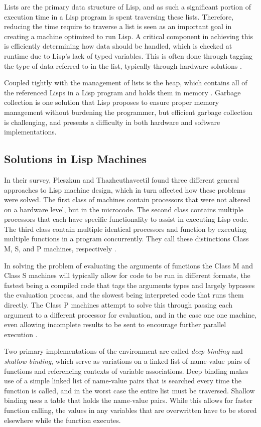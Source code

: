 \documentclass[journal]{IEEEtran}
\begin{document}
Lists are the primary data structure of Lisp, and as such a significant portion of execution time in a Lisp program is spent traversing these lists. Therefore, reducing the time require to traverse a list is seen as an important goal in creating a machine optimized to run Lisp. A critical component in achieving this is efficiently determining how data should be handled, which is checked at runtime due to Lisp's lack of typed variables. This is often done through tagging the type of data referred to in the list, typically through hardware solutions \cite{pt}.

Coupled tightly with the management of lists is the heap, which contains all of the referenced Lisps in a Lisp program and holds them in memory \cite{pt}. Garbage collection is one solution that Lisp proposes to ensure proper memory management without burdening the programmer, but efficient garbage collection is challenging, and presents a difficulty in both hardware and software implementations.

\subsection{Solutions in Lisp Machines}
In their survey, Pleszkun and Thazheuthaveetil found three different general approaches to Lisp machine design, which in turn affected how these problems were solved. The first class of machines contain processors that were not altered on a hardware level, but in the microcode. The second class contains multiple processors that each have specific functionality to assist in executing Lisp code. The third class contain multiple identical processors and function by executing multiple functions in a program concurrently. They call these distinctions Class M, S, and P machines, respectively \cite{pt}.

In solving the problem of evaluating the arguments of functions the Class M and Class S machines will typically allow for code to be run in different formats, the fastest being a compiled code that tags the arguments types and largely bypasses the evaluation process, and the slowest being interpreted code that runs them directly. The Class P machines attempt to solve this through passing each argument to a different processor for evaluation, and in the case one one machine, even allowing incomplete results to be sent to encourage further parallel execution \cite{pt}.

Two primary implementations of the environment are called \textit{deep binding} and \textit{shallow binding}, which serve as variations on a linked list of name-value pairs of functions and referencing contexts of variable associations. Deep binding makes use of a simple linked list of name-value pairs that is searched every time the function is called, and in the worst case the entire list must be traversed. Shallow binding uses a table that holds the name-value pairs. While this allows for faster function calling, the values in any variables that are overwritten have to be stored elsewhere while the function executes.
\end{document}
